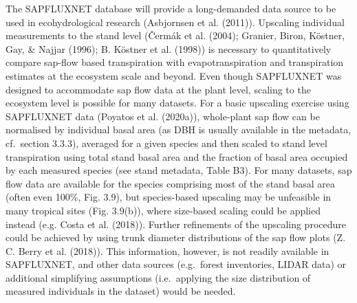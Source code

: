 \documentclass[11pt,twoside]{reedthesis}
\begin{document}
The SAPFLUXNET database will provide a long-demanded data source to be
used in ecohydrological research (Asbjornsen et al. (2011)). Upscaling
individual measurements to the stand level (Čermák et al. (2004);
Granier, Biron, Köstner, Gay, \& Najjar (1996); B. Köstner et al.
(1998)) is necessary to quantitatively compare sap-flow based
transpiration with evapotranspiration and transpiration estimates at the
ecosystem scale and beyond. Even though SAPFLUXNET was designed to
accommodate sap flow data at the plant level, scaling to the ecosystem
level is possible for many datasets. For a basic upscaling exercise
using SAPFLUXNET data (Poyatos et al. (2020a)), whole-plant sap flow can
be normalised by individual basal area (as DBH is usually available in
the metadata, cf.~section 3.3.3), averaged for a given species and then
scaled to stand level transpiration using total stand basal area and the
fraction of basal area occupied by each measured species (see stand
metadata, Table B3). For many datasets, sap flow data are available for
the species comprising most of the stand basal area (often even 100\%,
Fig. 3.9), but species-based upscaling may be unfeasible in many
tropical sites (Fig. 3.9(b)), where size-based scaling could be applied
instead (e.g. Costa et al. (2018)). Further refinements of the upscaling
procedure could be achieved by using trunk diameter distributions of the
sap flow plots (Z. C. Berry et al. (2018)). This information, however,
is not readily available in SAPFLUXNET, and other data sources
(e.g.~forest inventories, LIDAR data) or additional simplifying
assumptions (i.e.~applying the size distribution of measured individuals
in the dataset) would be needed.\par
\end{document}
